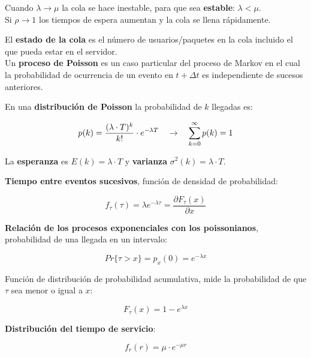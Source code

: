 \documentclass[9pt,landscape]{article}
\begin{document}
\begin{multicols}{3}
Cuando $\lambda \rightarrow \mu$ la cola se hace inestable, para que sea \textbf{estable}: $\lambda < \mu$.\\
	
Si $\rho \rightarrow 1$ los tiempos de espera aumentan y la cola se llena rápidamente.

El \textbf{estado de la cola} es el número de usuarios/paquetes en la cola incluido el que pueda estar en el servidor.\\

Un \textbf{proceso de Poisson} es un caso particular del proceso de Markov en el cual la probabilidad de ocurrencia de un evento en $t + \Delta t$ es independiente de sucesos anteriores.

En una \textbf{distribución de Poisson} la probabilidad de $k$ llegadas es:

	\begin{equation*}
		p(k) = \frac{(\lambda \cdot T)^k}{k!} \cdot e^{- \lambda T} \hspace{10 pt} \rightarrow \hspace{10 pt}  \sum_{k=0}^{\infty} p(k) = 1
	\end{equation*}
	
La \textbf{esperanza} es $E(k)= \lambda \cdot T$ y \textbf{varianza} $\sigma^{2} (k) = \lambda \cdot T$.


\textbf{Tiempo entre eventos sucesivos}, función de densidad de probabilidad:

	\begin{equation*}
		f_{\tau} (\tau) = \lambda e^{- \lambda \tau}	 = \frac{\partial F_{\tau}(x)}{\partial x}
	\end{equation*}


\textbf{Relación de los procesos exponenciales con los poissonianos}, probabilidad de una llegada en un intervalo:

	\begin{equation*}
		Pr\{ \tau > x \} = p_{x}(0) = e^{-\lambda x}
	\end{equation*}
	
Función de distribución de probabilidad acumulativa, mide la probabilidad de que $\tau$ sea menor o igual a $x$:

	\begin{equation*}
		F_{\tau}(x) = 1 - e^{\lambda x}
	\end{equation*}
	
\textbf{Distribución del tiempo de servicio}:

	\begin{equation*}
	f_{r}(r) = \mu \cdot e^{- \mu r}
	\end{equation*}


\end{multicols}
\end{document}
